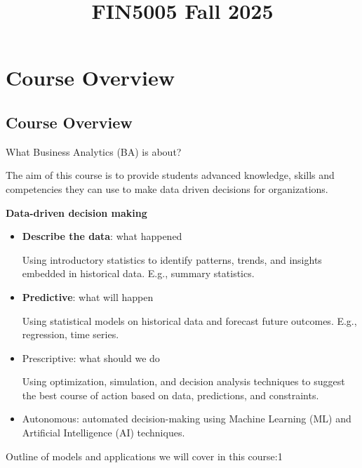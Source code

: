 \documentclass[
  12pt,
  letterpaper,
]{scrbook}
\title{FIN5005 Fall 2025}
\author{}
\date{}
\renewcommand*\contentsname{Table of contents}
\newcommand\contentsname{Table of contents}
\theoremstyle{definition}
\theoremstyle{plain}
\theoremstyle{remark}
\begin{document}
\frontmatter
\maketitle

\renewcommand*\contentsname{Table of contents}
{
\setcounter{tocdepth}{2}
\tableofcontents
}

\mainmatter
\chapter{Course Overview}\label{course-overview}

\section{Course Overview}\label{course-overview-1}

What Business Analytics (BA) is about?

The aim of this course is to provide students advanced knowledge, skills
and competencies they can use to make data driven decisions for
organizations.

\textbf{Data-driven decision making}

\begin{itemize}
\item
  \textbf{Describe the data}: what happened

  Using introductory statistics to identify patterns, trends, and
  insights embedded in historical data. E.g., summary statistics.
\item
  \textbf{Predictive}: what will happen

  Using statistical models on historical data and forecast future
  outcomes. E.g., regression, time series.
\item
  Prescriptive: what should we do

  Using optimization, simulation, and decision analysis techniques to
  suggest the best course of action based on data, predictions, and
  constraints.
\item
  Autonomous: automated decision-making using Machine Learning (ML) and
  Artificial Intelligence (AI) techniques.
\end{itemize}

Outline of models and applications we will cover in this course:1
\end{document}
